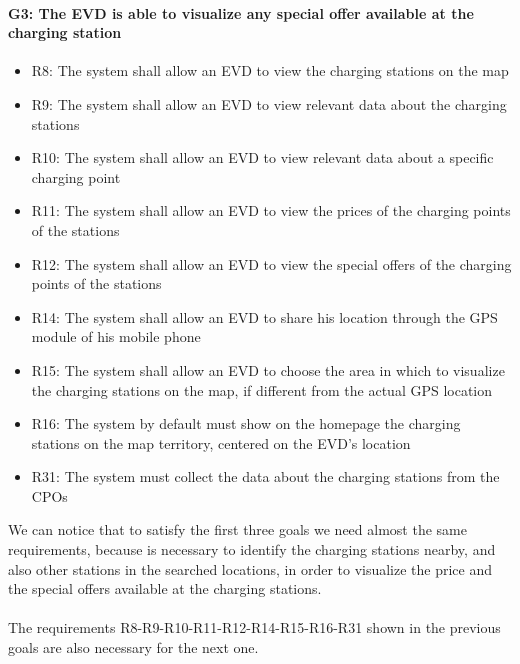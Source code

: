 \paragraph{G3: The EVD is able to visualize any special offer available at the charging station}
\begin{itemize}
    \item R8: The system shall allow an EVD to view the charging stations on the map
    \item R9: The system shall allow an EVD to view relevant data about the charging stations
    \item R10: The system shall allow an EVD to view relevant data about a specific charging point
    \item R11: The system shall allow an EVD to view the prices of the charging points of the stations
    \item R12: The system shall allow an EVD to view the special offers of the charging points of the stations
    \item R14: The system shall allow an EVD to share his location through the GPS module of his mobile phone
    \item R15: The system shall allow an EVD to choose the area in which to visualize the charging stations on the map, if different from the actual GPS location
    \item R16: The system by default must show on the homepage the charging stations on the map territory, centered on the EVD's location
    \item R31: The system must collect the data about the charging stations from the CPOs
\end{itemize}
We can notice that to satisfy the first three goals we need almost the same requirements, because is necessary to identify the charging stations nearby, and also other stations in the searched locations, in order to visualize the price and the special offers available at the charging stations.\\\\
The requirements R8-R9-R10-R11-R12-R14-R15-R16-R31 shown in the previous goals are also necessary for the next one.

